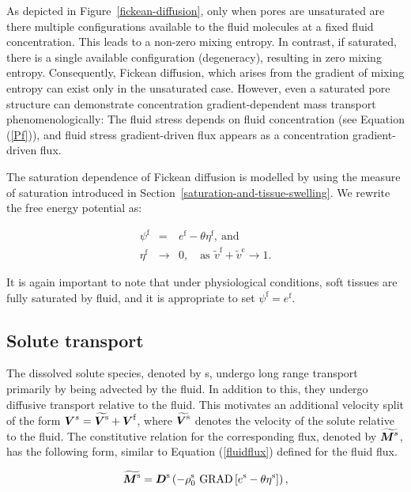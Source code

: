 As depicted in Figure~\ref{fickean-diffusion}, only when pores are
unsaturated are there multiple configurations available to the fluid
molecules at a fixed fluid concentration.  This leads to a non-zero
mixing entropy. In contrast, if saturated, there is a single available
configuration (degeneracy), resulting in zero mixing
entropy. Consequently, Fickean diffusion, which arises from the
gradient of mixing entropy can exist only in the unsaturated
case. However, even a saturated pore structure can demonstrate
concentration gradient-dependent mass transport phenomenologically:
The fluid stress depends on fluid concentration (see Equation
(\ref{Pf})), and fluid stress gradient-driven flux appears as a
concentration gradient-driven flux.

The saturation dependence of Fickean diffusion is modelled by using
the measure of saturation introduced in
Section~\ref{saturation-and-tissue-swelling}. We rewrite the free
energy potential as:

\begin{eqnarray}
\psi^\mathrm{f} &=&  
e^\mathrm{f} - \theta\eta^\mathrm{f},\ \mathrm{and}\nonumber\\
\eta^\mathrm{f} &\to& 0, \quad \mbox{as}\ \, \tilde{v}^\mathrm{f} +
\tilde{v}^\mathrm{c} \to 1.
\label{fickeanmobility}
\end{eqnarray}

\noindent It is again important to note that under physiological
conditions, soft tissues are fully saturated by fluid, and it is
appropriate to set $\psi^\mathrm{f} = e^\mathrm{f}$.

\subsection{Solute transport}
\label{solute-transport}

The dissolved solute species, denoted by s, undergo long range
transport primarily by being advected by the fluid. In addition to
this, they undergo diffusive transport relative to the fluid. This
motivates an additional velocity split of the form
\mbox{$\mbox{\boldmath$ V$}^s=\widetilde{\mbox{\boldmath$ V$}^\mathrm{s}}+\mbox{\boldmath$ V$}^\mathrm{f}$}, where
$\widetilde{\mbox{\boldmath$ V$}^\mathrm{s}}$ denotes the velocity of the solute
relative to the fluid. The constitutive relation for the corresponding
flux, denoted by $\widetilde{\mbox{\boldmath$ M$}^s}$, has the following form, similar
to Equation (\ref {fluidflux}) defined for the fluid flux.

\begin{equation}
\widetilde{\mbox{\boldmath$ M$}^\mathrm{s}} = \mbox{\boldmath$ D$}^\mathrm{s}\left( -
\rho^\mathrm{s}_0\ \mathrm{GRAD}\left[e^\mathrm{s} -
  \theta\eta^\mathrm{s}\right]\right),
\label{soluteflux}
\end{equation}

